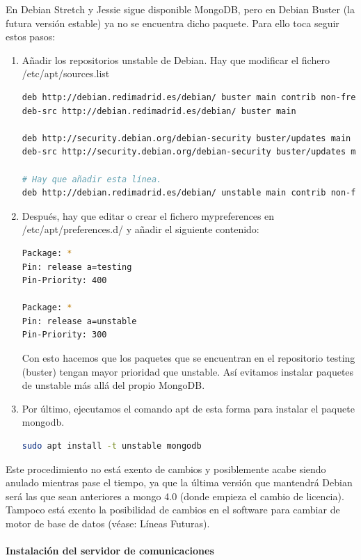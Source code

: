 \documentclass[spanish,12pt, a4paper, twoside]{paper}
\begin{document}
En Debian Stretch y Jessie sigue disponible MongoDB, pero en Debian Buster (la futura versión estable) ya no se encuentra dicho paquete. Para ello toca seguir estos pasos:

\begin{enumerate}
\item Añadir los repositorios unstable de Debian. Hay que modificar el fichero /etc/apt/sources.list
\begin{lstlisting}[language=sh]
deb http://debian.redimadrid.es/debian/ buster main contrib non-free
deb-src http://debian.redimadrid.es/debian/ buster main

deb http://security.debian.org/debian-security buster/updates main
deb-src http://security.debian.org/debian-security buster/updates main

# Hay que añadir esta línea.
deb http://debian.redimadrid.es/debian/ unstable main contrib non-free
\end{lstlisting}

\item Después, hay que editar o crear el fichero mypreferences en /etc/apt/preferences.d/ y añadir el siguiente contenido:
\begin{lstlisting}[language=sh]
Package: *
Pin: release a=testing
Pin-Priority: 400

Package: *
Pin: release a=unstable
Pin-Priority: 300
\end{lstlisting}

Con esto hacemos que los paquetes que se encuentran en el repositorio testing (buster) tengan mayor prioridad que unstable. Así evitamos instalar paquetes de unstable más allá del propio MongoDB.

\item Por último, ejecutamos el comando apt de esta forma para instalar el paquete mongodb.
\begin{lstlisting}[language=sh]
sudo apt install -t unstable mongodb
\end{lstlisting}
\end{enumerate}

Este procedimiento no está exento de cambios y posiblemente acabe siendo anulado mientras pase el tiempo, ya que la última versión que mantendrá Debian será las que sean anteriores a mongo 4.0 (donde empieza el cambio de licencia). Tampoco está exento la posibilidad de cambios en el software para cambiar de motor de base de datos (véase: Líneas Futuras).

\paragraph{Instalación del servidor de comunicaciones}
\end{document}
